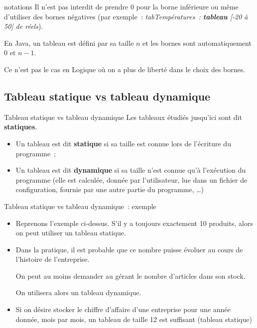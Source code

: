 \begin{frame}{notations}
	Il n'est pas interdit de prendre 0 pour la borne
	inférieure ou même d'utiliser des bornes négatives
	(par exemple~: \textit{tabTempératures~: 
	\textbf{tableau} [-20 à 50] de réels}).

	\bigskip
	
	En Java, un tableau est défini par sa taille $n$ et les bornes sont
	automatiquement $0$ et $n-1$. 
	
	Ce n'est pas le cas en Logique où on a plus 
	de liberté dans le choix des bornes.
\end{frame}

\subsection{Tableau statique vs tableau dynamique}

\begin{frame}{Tableau statique vs tableau dynamique}
	Les tableaux étudiés jusqu'ici sont dit \textbf{statiques}.
	
	\begin{itemize}
	\item
	Un tableau est dit \textbf{statique} si sa taille 
	est connue lors de l’écriture du programme~;
	\item
	Un tableau est dit \textbf{dynamique}
	si sa taille n’est connue qu’à l’exécution du programme (elle est
	calculée, donnée par l’utilisateur, lue dans un fichier de
	configuration, fournie par une autre partie du programme, \dots)
	\end{itemize}
\end{frame}

\begin{frame}{Tableau statique vs tableau dynamique~: exemple}
	\begin{itemize}
	\item
		Reprenons l’exemple ci-dessus. 
		S’il y a toujours exactement 10 produits, 
		alors on peut utiliser un tableau statique. 
	\item
		Dans la pratique, il est probable que ce nombre puisse évoluer 
		au cours de l’histoire de l’entreprise.
		
		On peut au moins demander au gérant le nombre d'articles dans son stock.
		
		On utilisera alors un tableau dynamique.
	\item 
		Si on désire stocker le chiffre d’affaire d’une entreprise 
		pour une année donnée, mois par mois, un tableau de
		taille 12 est suffisant (tableau statique)
	\end{itemize}
\end{frame}

